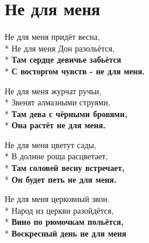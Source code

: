 \vspace{\fill}\newpage

\section{Не для меня}
\label{song:Не_для_меня}

\medskip

\begin{minipage}{\linewidth}
Не для меня придёт весна,\\*
Не для меня Дон разольётся,\\*
\textbf{Там сердце девичье забьётся}\\*
\textbf{С восторгом чувств - не для меня.}\\
\end{minipage}\par\medskip\nobreak

\medskip

\begin{minipage}{\linewidth}
Не для меня журчат ручьи,\\*
Звенят алмазными струями,\\*
\textbf{Там дева с чёрными бровями,}\\*
\textbf{Она растёт не для меня.}\\
\end{minipage}\par\medskip\nobreak

\medskip

\begin{minipage}{\linewidth}
Не для меня цветут сады,\\*
В долине роща расцветает,\\*
\textbf{Там соловей весну встречает,}\\*
\textbf{Он будет петь не для меня.}\\
\end{minipage}\par\medskip\nobreak

\medskip

\begin{minipage}{\linewidth}
Не для меня церковный звон.\\*
Народ из церкви разойдётся,\\*
\textbf{Вино по рюмочкам польётся,}\\*
\textbf{Воскресный день не для меня}\\
\end{minipage}\par\medskip\nobreak

